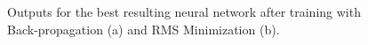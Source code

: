 \documentclass[11pt]{article}
\begin{document}
\begin{figure}[]
	\centering
		\caption{Outputs for the best resulting neural network after training with Back-propagation (a) and RMS Minimization (b).}
	\label{fig:output_rms-w-alpha_bpgt}	
\end{figure}
\end{document}

